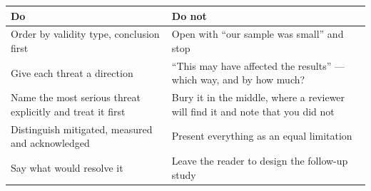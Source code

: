 \begin{center}
\small
\begin{tabular}{@{}L{3.6cm}L{10.7cm}@{}}
\toprule
\textbf{Do} & \textbf{Do not} \\
\midrule
Order by validity type, conclusion first
  & Open with ``our sample was small'' and stop \\
Give each threat a direction
  & ``This may have affected the results'' --- which way, and by how much? \\
Name the most serious threat explicitly and treat it first
  & Bury it in the middle, where a reviewer will find it and note that you did
    not \\
Distinguish mitigated, measured and acknowledged
  & Present everything as an equal limitation \\
Say what would resolve it
  & Leave the reader to design the follow-up study \\
\bottomrule
\end{tabular}
\end{center}

